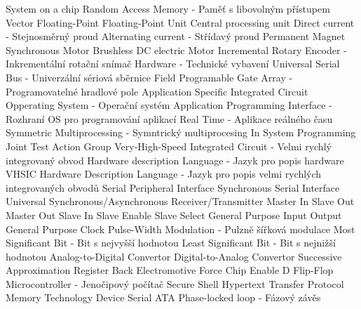  {System on a chip}
 {Random Access Memory - Paměť s libovolným přístupem}
 {Vector Floating-Point}
 {Floating-Point Unit}
 {Central processing unit}
 {Direct current - Stejnosměrný proud}
 {Alternating current - Střídavý proud}
 {Permanent Magnet Synchronous Motor}
 {Brushless DC electric Motor}
 {Incremental Rotary Encoder - Inkrementální rotační snímač}
 {Hardware - Technické vybavení}
 {Universal Serial Bus - Univerzální sériová sběrnice}
 {Field Programable Gate Array - Programovatelné hradlové pole}
 {Application Specific Integrated Circuit}
 {Opperating System - Operační systém}
 {Application Programming Interface - Rozhraní OS pro programování aplikací}
 {Real Time - Aplikace reálného času}
 {Symmetric Multiprocessing - Symntrický multiprocesing}
 {In System Programming}
 {Joint Test Action Group}
 {Very-High-Speed Integrated Circuit - Velmi rychlý integrovaný obvod}
 {Hardware description Language - Jazyk pro popis hardware}
 {VHSIC Hardware Description Language - Jazyk pro popis velmi rychlých integrovaných obvodů}
 {Serial Peripheral Interface}
 {Synchronous Serial Interface}
 {Universal Synchronous/Asynchronous Receiver/Transmitter}
 {Master In Slave Out}
 {Master Out Slave In}
 {Slave Enable}
 {Slave Select}
 {General Purpose Input Output}
 {General Purpose Clock}
 {Pulse-Width Modulation - Pulzně šířková modulace}
 {Most Significant Bit - Bit s nejvyšší hodnotou}
 {Least Significant Bit - Bit s nejnižší hodnotou}
 {Analog-to-Digital Convertor}
 {Digital-to-Analog Convertor}
 {Successive Approximation Register}
 {Back Electromotive Force}
 {Chip Enable}
 {D Flip-Flop}
 {Microcontroller - Jenočipový počítač}
 {Secure Shell}
 {Hypertext Transfer Protocol}
 {Memory Technology Device}
 {Serial ATA}
 {Phase-locked loop - Fázový závěs}